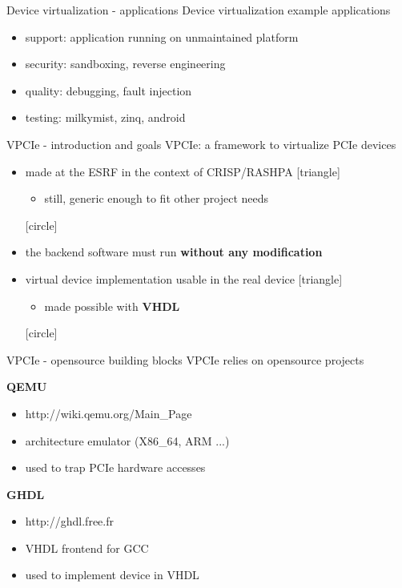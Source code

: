 \documentclass{beamer}
\begin{document}
\begin{frame}{Device virtualization - applications}
  Device virtualization example applications
  \begin{itemize}
  \item support: application running on unmaintained platform
  \item security: sandboxing, reverse engineering
  \item quality: debugging, fault injection
  \item testing: milkymist, zinq, android
  \end{itemize}
\end{frame}

\begin{frame}{VPCIe - introduction and goals}
  VPCIe: a framework to virtualize PCIe devices
  \begin{itemize}
  \item made at the ESRF in the context of CRISP/RASHPA
    [triangle]
    \begin{itemize}
    \item still, generic enough to fit other project needs
    \end{itemize}
    [circle]
  \item the backend software must run \textbf{without any modification}
  \item virtual device implementation usable in the real device
    [triangle]
    \begin{itemize}
    \item made possible with \textbf{VHDL}
    \end{itemize}
    [circle]
  \end{itemize}
\end{frame}

\begin{frame}{VPCIe - opensource building blocks}
  VPCIe relies on opensource projects
  \newline

  \textbf{QEMU}
  \begin{itemize}
  \item http://wiki.qemu.org/Main\_Page
  \item architecture emulator (X86\_64, ARM ...)
  \item used to trap PCIe hardware accesses
  \end{itemize}

  \textbf{GHDL}
  \begin{itemize}
  \item http://ghdl.free.fr
  \item VHDL frontend for GCC
  \item used to implement device in VHDL
  \end{itemize}

\end{frame}
\end{document}
